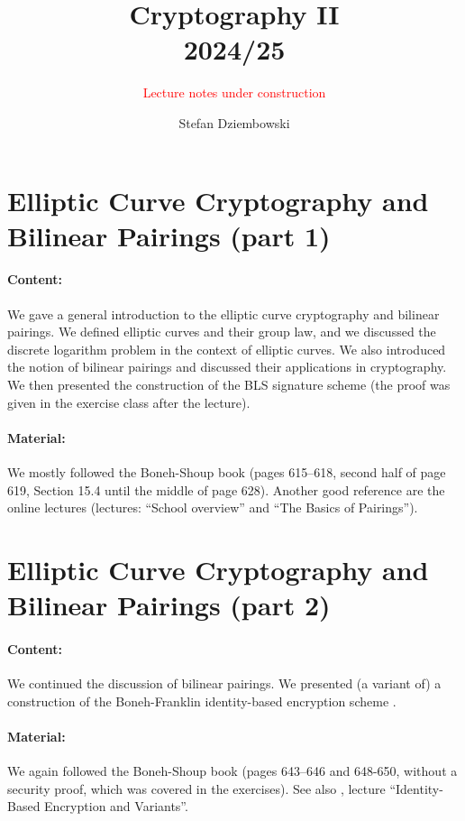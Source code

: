 \documentclass{llncs}
\title{Cryptography II\\ 2024/25}
\subtitle{\textcolor{red}{Lecture notes under construction}}
\author{Stefan Dziembowski}
\institute{University of Warsaw}
\begin{document}
\maketitle

\section{Elliptic Curve Cryptography and Bilinear Pairings (part 1)}


\paragraph{Content:} We gave a general introduction to the elliptic curve cryptography and bilinear pairings. We defined elliptic curves and their group law, and we discussed the discrete logarithm problem in the context of elliptic curves. We also introduced the notion of bilinear pairings and discussed their applications in cryptography. We then presented the construction of the BLS signature scheme \cite{Boneh2001} (the proof was given in the exercise class after the lecture).

\paragraph{Material:} We mostly followed the Boneh-Shoup book \cite{Boneh2023} (pages 615--618, second half of page 619, Section 15.4 until the middle of page 628). Another good reference are the online lectures \cite{WinterSchool} (lectures: ``School overview'' and ``The Basics of Pairings'').



\section{Elliptic Curve Cryptography and Bilinear Pairings (part 2)}


\paragraph{Content:} We continued the discussion of bilinear pairings. We presented (a variant of) a construction of the Boneh-Franklin identity-based encryption scheme \cite{Boneh2003}.

\paragraph{Material:} We again followed the Boneh-Shoup book \cite{Boneh2023} (pages 643--646 and 648-650, without a security proof, which was covered in the exercises). See also \cite{WinterSchool}, lecture ``Identity-Based Encryption and Variants''.
\end{document}
